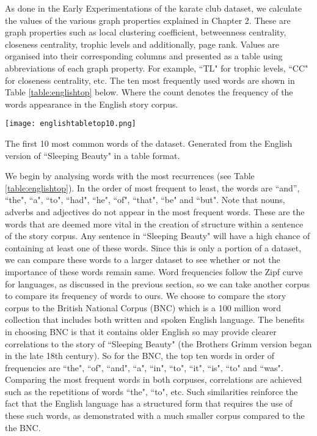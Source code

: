 As done in the Early Experimentations of the karate club dataset, we calculate the values of the various graph properties explained in Chapter 2. These are graph properties such as local clustering coefficient, betweenness centrality, closeness centrality, trophic levels and additionally, page rank. Values are organised into their corresponding columns and presented as a table using abbreviations of each graph property. For example, ``TL" for trophic levels, ``CC" for closeness centrality, etc. The ten most frequently used words are shown in Table \ref{table:englishtop} below. Where the count denotes the frequency of the words appearance in the English story corpus. 

\begin{table}[H]
\centering
\texttt{[image: englishtabletop10.png]}
\caption{The first 10 most common words of the dataset. Generated from the English version of ``Sleeping Beauty" in a table format.}
\label{table:englishtop}
\end{table}

We begin by analysing words with the most recurrences (see Table \ref{table:englishtop}). In the order of most frequent to least, the words are ``and'', ``the", ``a", ``to", ``had", ``he", ``of", ``that", ``be" and ``but". Note that nouns, adverbs and adjectives do not appear in the most frequent words. These are the words that are deemed more vital in the creation of structure within a sentence of the story corpus. Any sentence in ``Sleeping Beauty" will have a high chance of containing at least one of these words. Since this is only a portion of a dataset, we can compare these words to a larger dataset to see whether or not the importance of these words remain same. Word frequencies follow the Zipf curve for languages, as discussed in the previous section, so we can take another corpus to compare its frequency of words to ours. We choose to compare the story corpus to the British National Corpus (BNC) \cite{bnc2007british} which is a 100 million word collection that includes both written and spoken English language. The benefits in choosing BNC is that it contains older English so may provide clearer correlations to the story of ``Sleeping Beauty" (the Brothers Grimm version began in the late 18th century). So for the BNC, the top ten words \cite{leech2014word} in order of frequencies are ``the", ``of", ``and", ``a", ``in", ``to", ``it", ``is", ``to" and ``was". Comparing the most frequent words in both corpuses, correlations are achieved such as the repetitions of words ``the", ``to", etc. Such similarities reinforce the fact that the English language has a structured form that requires the use of these such words, as demonstrated with a much smaller corpus compared to the the BNC.

